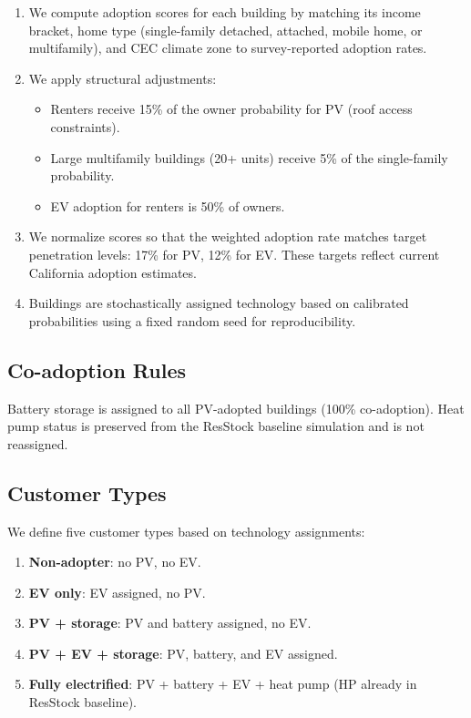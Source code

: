 \documentclass[11pt]{article}
\begin{document}
\begin{enumerate}
\item We compute adoption scores for each building by matching its income bracket, home type (single-family detached, attached, mobile home, or multifamily), and CEC climate zone to survey-reported adoption rates.

\item We apply structural adjustments:
\begin{itemize}
\item Renters receive 15\% of the owner probability for PV (roof access constraints).
\item Large multifamily buildings (20+ units) receive 5\% of the single-family probability.
\item EV adoption for renters is 50\% of owners.
\end{itemize}

\item We normalize scores so that the weighted adoption rate matches target penetration levels: 17\% for PV, 12\% for EV. These targets reflect current California adoption estimates.

\item Buildings are stochastically assigned technology based on calibrated probabilities using a fixed random seed for reproducibility.
\end{enumerate}

\subsection{Co-adoption Rules}

Battery storage is assigned to all PV-adopted buildings (100\% co-adoption). Heat pump status is preserved from the ResStock baseline simulation and is not reassigned.

\subsection{Customer Types}

We define five customer types based on technology assignments:

\begin{enumerate}
\item \textbf{Non-adopter}: no PV, no EV.
\item \textbf{EV only}: EV assigned, no PV.
\item \textbf{PV + storage}: PV and battery assigned, no EV.
\item \textbf{PV + EV + storage}: PV, battery, and EV assigned.
\item \textbf{Fully electrified}: PV + battery + EV + heat pump (HP already in ResStock baseline).
\end{enumerate}
\end{document}
